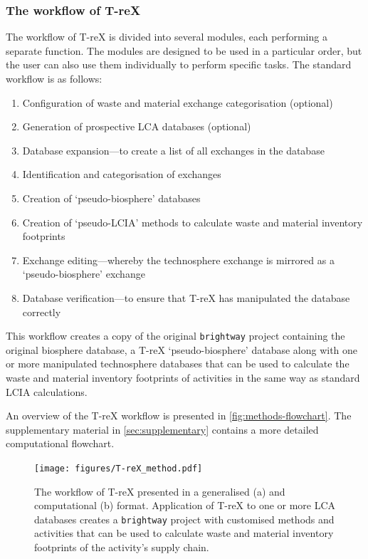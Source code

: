 \documentclass[a4paper,fleqn,longmktitle]{cas-dc}
\begin{document}
\subsubsection{The workflow of T-reX}

The workflow of T-reX is divided into several modules, each performing a separate function. The modules are designed to be used in a particular order, but the user can also use them individually to perform specific tasks. The standard workflow is as follows:

\begin{enumerate}
    \item Configuration of waste and material exchange categorisation (optional)
    \item Generation of prospective LCA databases (optional)
    \item Database expansion---to create a list of all exchanges in the database
    \item Identification and categorisation of exchanges
    \item Creation of `pseudo-biosphere' databases
    \item Creation of `pseudo-LCIA' methods to calculate waste and material inventory footprints
    \item Exchange editing---whereby the technosphere exchange is mirrored as a `pseudo-biosphere' exchange
    \item Database verification---to ensure that T-reX has manipulated the database correctly
\end{enumerate}

This workflow creates a copy of the original \texttt{brightway} project containing the original biosphere database, a T-reX `pseudo-biosphere' database along with one or more manipulated technosphere databases that can be used to calculate the waste and material inventory footprints of activities in the same way as standard LCIA calculations.

An overview of the T-reX workflow is presented in \autoref{fig:methods-flowchart}. The supplementary material in \autoref{sec:supplementary} contains a more detailed computational flowchart.

\begin{figure}[H]
    \centering
    \caption{The workflow of T-reX presented in a generalised (a) and computational (b) format. Application of T-reX to one or more LCA databases creates a \texttt{brightway} project with customised methods and activities that can be used to calculate waste and material inventory footprints of the activity's supply chain.}
    \texttt{[image: figures/T-reX\_method.pdf]}\label{fig:methods-flowchart}
\end{figure}
\end{document}

